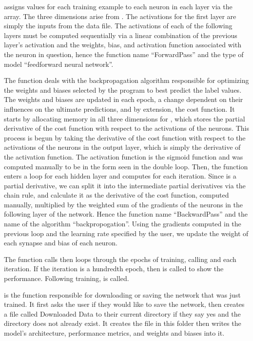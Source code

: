 \documentclass[12pt]{article}
\begin{document}
 assigns values for each training example to each neuron in each layer via the  array. The three dimensions arise from . The activations for the first layer are simply the inputs from the data file. The activations of each of the following layers must be computed sequentially via a linear combination of the previous layer’s activation and the weights, bias, and activation function associated with the neuron in question, hence the function name “ForwardPass” and the type of model “feedforward neural network”.

The  function deals with the backpropagation algorithm responsible for optimizing the weights and biases selected by the program to best predict the label values. The weights and biases are updated in each epoch, a change dependent on their influences on the ultimate predictions, and by extension, the cost function. It starts by allocating memory in all three dimensions for , which stores the partial derivative of the cost function with respect to the activations of the neurons. This process is begun by taking the derivative of the cost function with respect to the activations of the neurons in the output layer, which is simply the derivative of the activation function. The activation function is the sigmoid function and was computed manually to be in the form seen in the double  loop. Then, the function enters a loop for each hidden layer and computes  for each iteration. Since  is a partial derivative, we can split it into the intermediate partial derivatives via the chain rule, and calculate it as the derivative of the cost function, computed manually, multiplied by the weighted sum of the gradients of the neurons in the following layer of the network. Hence the function name “BackwardPass” and the name of the algorithm “backpropogation”. Using the gradients computed in the previous loop and the learning rate specified by the user, we update the weight of each synapse and bias of each neuron.

The  function calls  then loops through the epochs of training, calling  and  each iteration. If the iteration is a hundredth epoch, then  is called to show the performance. Following training,  is called.

 is the function responsible for downloading or saving the network that was just trained. It first asks the user if they would like to save the network, then creates a file called Downloaded Data to their current directory if they say yes and the directory does not already exist. It creates the file  in this folder then writes the model’s architecture, performance metrics, and weights and biases into it.
\end{document}
